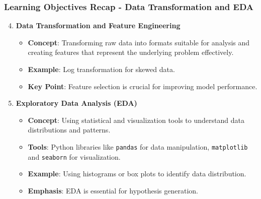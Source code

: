 \documentclass[aspectratio=169]{beamer}
\begin{document}
\begin{frame}[fragile]
    \frametitle{Learning Objectives Recap - Data Transformation and EDA}
    \begin{enumerate}
        \setcounter{enumi}{3}
        \item \textbf{Data Transformation and Feature Engineering}
        \begin{itemize}
            \item \textbf{Concept}: Transforming raw data into formats suitable for analysis and creating features that represent the underlying problem effectively.
            \item \textbf{Example}: Log transformation for skewed data.
            \item \textbf{Key Point}: Feature selection is crucial for improving model performance.
        \end{itemize}
        
        \item \textbf{Exploratory Data Analysis (EDA)}
        \begin{itemize}
            \item \textbf{Concept}: Using statistical and visualization tools to understand data distributions and patterns.
            \item \textbf{Tools}: Python libraries like \texttt{pandas} for data manipulation, \texttt{matplotlib} and \texttt{seaborn} for visualization.
            \item \textbf{Example}: Using histograms or box plots to identify data distribution.
            \item \textbf{Emphasis}: EDA is essential for hypothesis generation.
        \end{itemize}
    \end{enumerate}
\end{frame}
\end{document}
